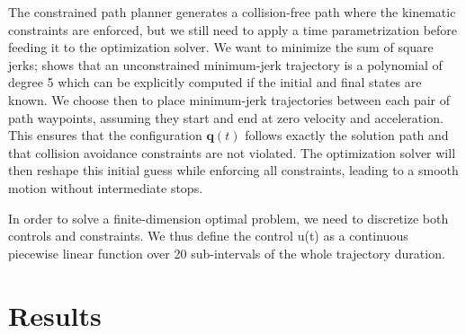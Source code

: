 The constrained path planner generates a collision-free path where the
kinematic constraints are enforced, but we still need to apply a time
parametrization before feeding it to the optimization solver. We want
to minimize the sum of square jerks; \cite{Flash1985} shows that an
unconstrained minimum-jerk trajectory is a polynomial of degree 5
which can be explicitly computed if the initial and final states are
known. We choose then to place minimum-jerk trajectories between each
pair of path waypoints, assuming they start and end at zero velocity
and acceleration. This ensures that the configuration $\mathbf{q}(t)$
follows exactly the solution path and that collision avoidance
constraints are not violated. The optimization solver will then
reshape this initial guess while enforcing all constraints, leading to
a smooth motion without intermediate stops.

In order to solve a finite-dimension optimal problem, we need to
discretize both controls and constraints. We thus define the control
u(t) as a continuous piecewise linear function over 20 sub-intervals
of the whole trajectory duration.

\section{Results}
\label{results}

